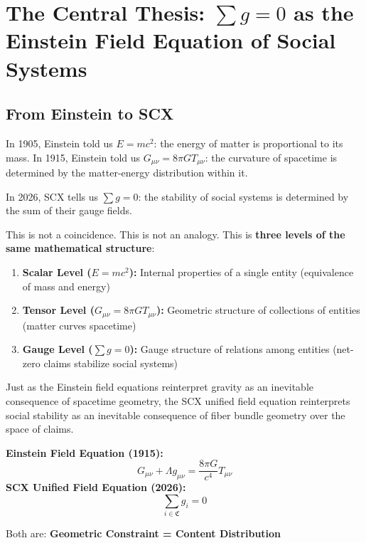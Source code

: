 \documentclass[12pt,a4paper]{article}
\theoremstyle{plain}
\theoremstyle{definition}
\newcommand{\ClaimSpace}{\mathfrak{C}}
\begin{document}

\section{The Central Thesis: $\sum g = 0$ as the Einstein Field Equation of Social Systems}

\subsection{From Einstein to SCX}

In 1905, Einstein told us $E = mc^2$: the energy of matter is proportional to its mass.
In 1915, Einstein told us $G_{\mu\nu} = 8\pi G T_{\mu\nu}$:
the curvature of spacetime is determined by the matter-energy distribution within it.

In 2026, SCX tells us $\sum g = 0$: the stability of social systems is determined by the sum of their gauge fields.

This is not a coincidence. This is not an analogy. This is \textbf{three levels of the same mathematical structure}:

\begin{enumerate}[label=\textbf{Level \arabic*:}]
    \item \textbf{Scalar Level ($E=mc^2$):} Internal properties of a single entity (equivalence of mass and energy)
    \item \textbf{Tensor Level ($G_{\mu\nu} = 8\pi G T_{\mu\nu}$):} Geometric structure of collections of entities (matter curves spacetime)
    \item \textbf{Gauge Level ($\sum g = 0$):} Gauge structure of relations among entities (net-zero claims stabilize social systems)
\end{enumerate}

Just as the Einstein field equations reinterpret gravity as an inevitable consequence of spacetime geometry, the SCX unified field equation reinterprets social stability as an inevitable consequence of fiber bundle geometry over the space of claims.

\begin{keyeq}
\textbf{Einstein Field Equation (1915):}
\begin{equation}
    G_{\mu\nu} + \Lambda g_{\mu\nu} = \frac{8\pi G}{c^4} T_{\mu\nu}
\end{equation}
\vspace{4pt}
\textbf{SCX Unified Field Equation (2026):}
\begin{equation}
    \boxed{\sum_{i \in \ClaimSpace} g_i = 0}
\end{equation}
\vspace{4pt}

Both are: \textbf{Geometric Constraint = Content Distribution}
\end{keyeq}
\end{document}
